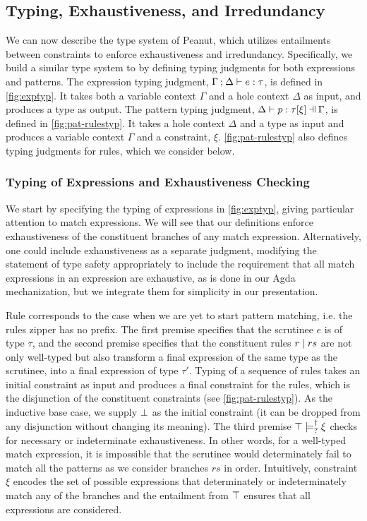 \subsection{Typing, Exhaustiveness, and Irredundancy}\label{sec:statics}



We can now describe the type system of Peanut, which utilizes entailments between constraints to enforce exhaustiveness and irredundancy.
  Specifically, we build a similar type system to
\citet{DBLP:journals/pacmpl/OmarVCH19} by defining typing judgments for both
expressions and patterns. The expression typing judgment, $\Gamma \mathbin{;} \Delta \vdash e : \tau$, is defined in \autoref{fig:exptyp}. It takes both a variable context $\Gamma$ and a hole context $\Delta$ as input, and produces a type as output. The pattern typing judgment, $\chpattyp{p}{\tau}{\xi}{\Gamma}{\Delta}$, is defined in \autoref{fig:pat-rulestyp}. It takes a hole context $\Delta$ and a type as input and produces a variable context $\Gamma$ and a constraint, $\xi$. \autoref{fig:pat-rulestyp} also defines typing judgments for rules, which we consider below.

\subsubsection{Typing of Expressions and Exhaustiveness Checking} \label{sec:exptyp}

We start by specifying the typing of expressions in \autoref{fig:exptyp}, giving particular attention to match expressions. We will see that our definitions enforce exhaustiveness of the constituent branches of any match expression. Alternatively, one could include exhaustiveness as a separate judgment, modifying the statement of type safety appropriately to include the requirement that all match expressions in an expression are exhaustive, as is done in our Agda mechanization, but we integrate them for simplicity in our presentation.

Rule \TMatchZPre corresponds to the case when we are yet to start pattern
matching, i.e. the rules zipper has no prefix. The first premise specifies that the scrutinee $e$ is of type $\tau$,
and the second premise specifies that the constituent rules $r \mid rs$ are not only
well-typed but also transform a final expression of the same type as the
scrutinee, into a final expression of type $\tau'$. 
Typing of a sequence of rules takes an initial constraint as input and produces a final constraint for the rules, 
which is the disjunction of the constituent constraints (see \autoref{fig:pat-rulestyp}). 
As the inductive base case, we supply $\bot$ as the initial constraint (it can be dropped from any disjunction without changing its meaning). 
The 
third premise $\top \models_{?}^{\dag} \xi$ checks for necessary or indeterminate exhaustiveness. 
In other words, for a well-typed match expression,
it is impossible that the scrutinee would determinately fail to match all the patterns as we consider branches $rs$ in order.
Intuitively, constraint $\xi$ encodes the set of possible expressions that determinately or indeterminately match any of the branches and the entailment from $\top$ ensures that all expressions are considered.

